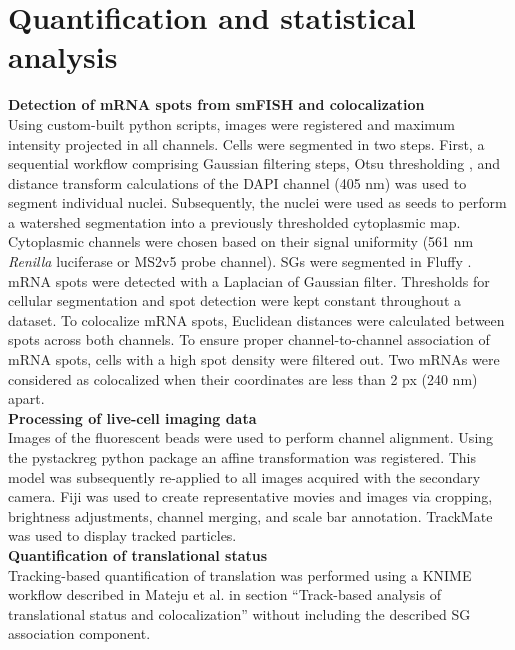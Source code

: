 \section{Quantification and statistical analysis}

\textbf{Detection of mRNA spots from smFISH and colocalization} \\
Using custom-built python scripts, images were registered and maximum intensity projected in all channels.
Cells were segmented in two steps.
First, a sequential workflow comprising Gaussian filtering steps, Otsu thresholding \cite{otsu_threshold_1979}, and distance transform calculations of the DAPI channel (405 nm) was used to segment individual nuclei.
Subsequently, the nuclei were used as seeds to perform a watershed segmentation into a previously thresholded cytoplasmic map.
Cytoplasmic channels were chosen based on their signal uniformity (561 nm \textit{Renilla} luciferase or MS2v5 probe channel).
SGs were segmented in Fluffy \cite{eichenberger_fluffy_2020}.
mRNA spots were detected with a Laplacian of Gaussian filter.
Thresholds for cellular segmentation and spot detection were kept constant throughout a dataset.
To colocalize mRNA spots, Euclidean distances were calculated between spots across both channels.
To ensure proper channel-to-channel association of mRNA spots, cells with a high spot density were filtered out.
Two mRNAs were considered as colocalized when their coordinates are less than 2 px (240 nm) apart.
\\

\textbf{Processing of live-cell imaging data} \\
Images of the fluorescent beads were used to perform channel alignment.
Using the pystackreg python package \cite{thevenaz_pyramid_1998} an affine transformation was registered.
This model was subsequently re-applied to all images acquired with the secondary camera.
Fiji \cite{schindelin_fiji_2012} was used to create representative movies and images via cropping, brightness adjustments, channel merging, and scale bar annotation.
TrackMate \cite{tinevez_trackmate:_2017} was used to display tracked particles.
\\

\textbf{Quantification of translational status} \\
Tracking-based quantification of translation was performed using a KNIME \cite{berthold_knime_2009} workflow described
    in Mateju et al. \cite{mateju_single-molecule_2020} in section “Track-based analysis of translational status and colocalization” without including the described SG association component.
\\

